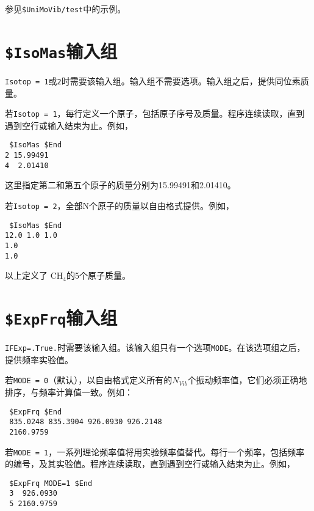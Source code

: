 \documentclass[12pt,a4paper,openany,twoside,cap,UTF8]{ctexbook}
\begin{document}
参见\verb|$UniMoVib/test|中的示例。

\section{\texttt{\$IsoMas}输入组} \label{sec:inp-isomas}

\verb|Isotop = 1|或\verb|2|时需要该输入组。输入组不需要选项。输入组之后，提供同位素质量。

\bigskip{}
若\verb|Isotop = 1|，每行定义一个原子，包括原子序号及质量。程序连续读取，直到遇到空行或输入结束为止。例如，
\begin{colorboxed}[oval=false,boxcolor=blue!75!black,bgcolor=blue!5!white]
\ttfamily
\begin{lstlisting}
 $IsoMas $End
2 15.99491
4  2.01410
\end{lstlisting}\end{colorboxed}
这里指定第二和第五个原子的质量分别为15.99491和2.01410。

\bigskip{}
若\verb|Isotop = 2|，全部N个原子的质量以自由格式提供。例如，
\begin{colorboxed}[oval=false,boxcolor=blue!75!black,bgcolor=blue!5!white]
\ttfamily
\begin{lstlisting}
 $IsoMas $End
12.0 1.0 1.0
1.0
1.0
\end{lstlisting}\end{colorboxed}
以上定义了 CH$_4$的5个原子质量。

\section{\texttt{\$ExpFrq}输入组} \label{sec:inp-expfrq}

\verb|IFExp=.True.|时需要该输入组。该输入组只有一个选项\verb|MODE|。在该选项组之后，提供频率实验值。

\bigskip{}
若\verb|MODE = 0|（默认），以自由格式定义所有的$N_{Vib}$个振动频率值，它们必须正确地排序，与频率计算值一致。例如：
\begin{colorboxed}[oval=false,boxcolor=blue!75!black,bgcolor=blue!5!white]
\ttfamily
\begin{lstlisting}
 $ExpFrq $End
 835.0248 835.3904 926.0930 926.2148
 2160.9759
\end{lstlisting}\end{colorboxed}


若\verb|MODE = 1|，一系列理论频率值将用实验频率值替代。每行一个频率，包括频率的编号，及其实验值。程序连续读取，直到遇到空行或输入结束为止。例如，
\begin{colorboxed}[oval=false,boxcolor=blue!75!black,bgcolor=blue!5!white]
\ttfamily
\begin{lstlisting}
 $ExpFrq MODE=1 $End
 3  926.0930
 5 2160.9759
\end{lstlisting}\end{colorboxed}
\end{document}
